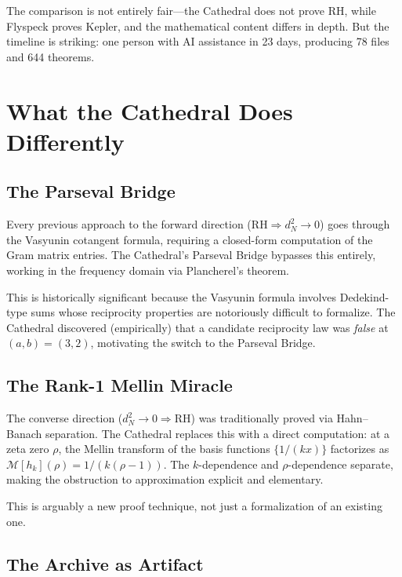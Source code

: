 \documentclass[11pt,a4paper]{article}
\newcommand{\RH}{\ensuremath{\mathrm{RH}}}
\begin{document}
The comparison is not entirely fair---the Cathedral does not prove
RH, while Flyspeck proves Kepler, and the mathematical content
differs in depth. But the timeline is striking: one person with AI
assistance in 23 days, producing 78 files and 644 theorems.

\section{What the Cathedral Does Differently}

\subsection{The Parseval Bridge}

Every previous approach to the forward direction
($\RH \Rightarrow d_N^2 \to 0$) goes through the Vasyunin
cotangent formula, requiring a closed-form computation of the
Gram matrix entries. The Cathedral's Parseval Bridge bypasses this
entirely, working in the frequency domain via Plancherel's theorem.

This is historically significant because the Vasyunin formula
involves Dedekind-type sums whose reciprocity properties are
notoriously difficult to formalize. The Cathedral discovered
(empirically) that a candidate reciprocity law was \emph{false}
at $(a,b) = (3,2)$, motivating the switch to the Parseval Bridge.

\subsection{The Rank-1 Mellin Miracle}

The converse direction ($d_N^2 \to 0 \Rightarrow \RH$) was
traditionally proved via Hahn--Banach separation. The Cathedral
replaces this with a direct computation: at a zeta zero $\rho$,
the Mellin transform of the basis functions $\{1/(kx)\}$
factorizes as $\mathcal{M}[h_k](\rho) = 1/(k(\rho-1))$. The
$k$-dependence and $\rho$-dependence separate, making the
obstruction to approximation explicit and elementary.

This is arguably a new proof technique, not just a formalization
of an existing one.

\subsection{The Archive as Artifact}
\end{document}
